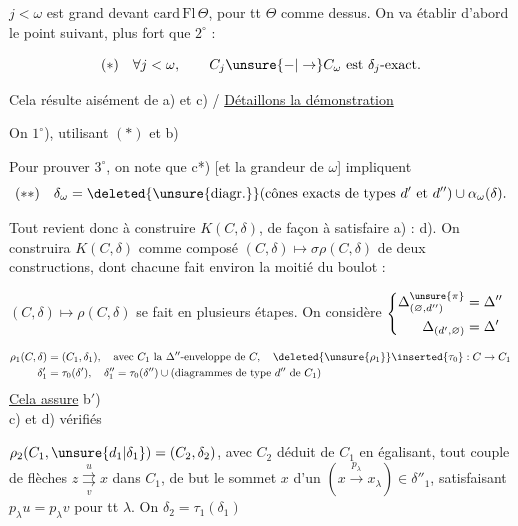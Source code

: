
$j<\omega$ est grand devant $\mathrm{card}\,\mathrm{Fl}\,\Theta$, pour tt $\Theta$ comme dessus. On va établir d'abord  le point suivant, plus fort que $2^\circ$ :

\[
(*)\quad\forall j<\omega,\qquad C_j\unsure{-|\to}C_\omega\text{ est }\delta_j\text{-exact.}
\]

Cela résulte aisément de a) et c)  / \uline{Détaillons la démonstration}

On   $1^\circ$), utilisant $(*)$ et b)

Pour prouver $3^\circ$, on note que  c*) [et la grandeur de $\omega$] impliquent
\[
(**)\quad\delta_\omega=\deleted{\unsure{\text{diagr.}}}(\text{cônes exacts de types }d'\text{ et }d'')\cup\alpha_\omega(\delta).
\]
\unsure{$\cup$}

Tout revient donc à construire $K(C,\delta)$, de façon à satisfaire a) : d). On construira  $K(C,\delta)$ comme composé $(C,\delta)\longmapsto\sigma\rho(C,\delta)$ de deux constructions, dont chacune fait environ la moitié du boulot :


$(C,\delta)\longmapsto\rho(C,\delta)$ se fait en plusieurs étapes. On considère $\left\{\begin{aligned}\Delta^{\unsure{\pi}}_{(\varnothing,d'')}&=\Delta''\\\Delta_{(d',\varnothing)}&=\Delta'\end{aligned}\right.$

\[
\begin{aligned}
\rho_1(C,\delta)&=(C_1,\delta_1),\quad\text{avec }C_1\text{ la }\Delta''\text{-enveloppe de }C,\quad\deleted{\unsure{\rho_1}}\inserted{\tau_0}:C\to C_1\\
\delta'_1&=\tau_0(\delta'),\quad\delta''_1=\tau_0(\delta'')\cup(\text{diagrammes de type }d''\text{ de }C_1)
\end{aligned}
\]
\uline{Cela assure} b$'$)\\
c) et d) vérifiés

$\rho_2(C_1,\unsure{d_1|\delta_1})=(C_2,\delta_2)$,  avec $C_2$ déduit de $C_1$ en égalisant, tout couple de flèches $z\overset{u}{\underset{v}{\rightrightarrows}}x$ dans $C_1$, de but le sommet $x$ d'un $(x\xrightarrow{p_\lambda}x_\lambda)\in\delta''_1$, satisfaisant $p_\lambda u=p_\lambda v$ pour tt $\lambda$. On  $\delta_2=\tau_1(\delta_1)$

